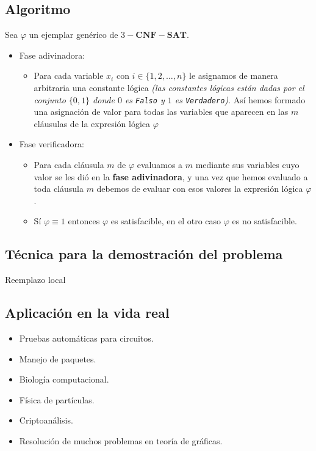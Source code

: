 \documentclass[a4paper]{article}
\begin{document}
\subsection{Algoritmo}
Sea \(\varphi\) un ejemplar genérico de \(3-\mathbf{CNF}-\mathbf{SAT}\).
\begin{itemize}
    \item Fase adivinadora:
    \begin{itemize}
        \item Para cada variable \(x_{i}\) con \(i \in \{1, 2, \dotsc, n\}\) le asignamos de manera arbitraria una constante lógica 
        \textit{(las constantes lógicas están dadas por el conjunto \(\{0, 1\}\) donde \(0\) es \texttt{Falso} y \(1\) es \texttt{Verdadero})}.
        Así hemos formado una asignación de valor para todas las variables que aparecen en las \(m\) cláusulas de la expresión lógica \(\varphi\)
    \end{itemize}
    \item Fase verificadora:
    \begin{itemize}
        \item Para cada cláusula \(m\) de \(\varphi\) evaluamos a \(m\) mediante sus variables cuyo valor se les dió en la \textbf{fase adivinadora},
        y una vez que hemos evaluado a toda cláusula \(m\) debemos de evaluar con esos valores la expresión lógica \(\varphi\).
        \item Sí \(\varphi \equiv 1\) entonces \(\varphi\) es satisfacible, en el otro caso \(\varphi\) es no satisfacible.
    \end{itemize}
\end{itemize}
\subsection{Técnica para la demostración del problema}
\noindent
Reemplazo local
\subsection{Aplicación en la vida real}
\begin{itemize}
    \item Pruebas automáticas para circuitos.
    \item Manejo de paquetes.
    \item Biología computacional.
    \item Física de partículas.
    \item Criptoanálisis.
    \item Resolución de muchos problemas en teoría de gráficas.
\end{itemize}
\newpage
\end{document}
